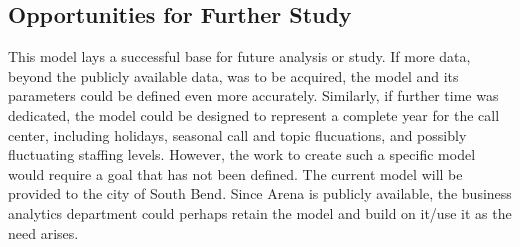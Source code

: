 \documentclass[12pt]{article}
\begin{document}
	\subsection{Opportunities for Further Study}

	This model lays a successful base for future analysis or study.  If more data, beyond the publicly available data, was to be acquired, the model and its parameters could be defined even more accurately.  Similarly, if further time was dedicated, the model could be designed to represent a complete year for the call center, including holidays, seasonal call and topic flucuations, and possibly fluctuating staffing levels.  However, the work to create such a specific model would require a goal that has not been defined.  The current model will be provided to the city of South Bend.  Since Arena is publicly available, the business analytics department could perhaps retain the model and build on it/use it as the need arises.
\end{document}
